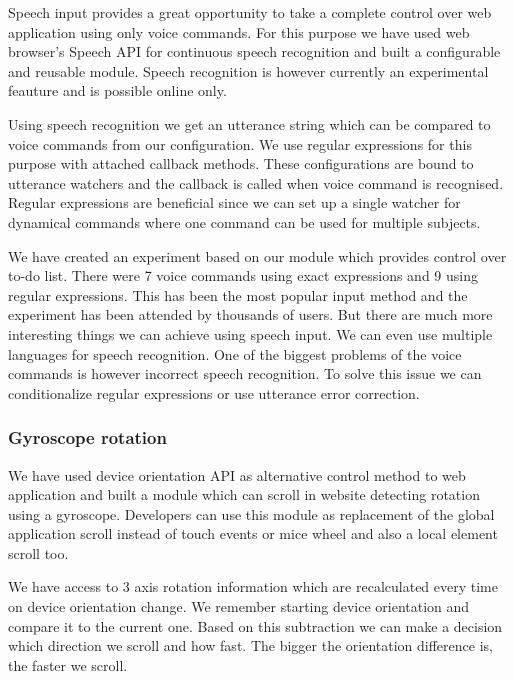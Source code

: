 \documentclass{iitsrc}
\begin{document}
Speech input provides a great opportunity to take a complete control over web application using only voice commands. For this purpose we have used web browser's Speech API for continuous speech recognition and built a configurable and reusable module. Speech recognition is however currently an experimental feauture and is possible online only.

Using speech recognition we get an utterance string which can be compared to voice commands from our configuration. We use regular expressions for this purpose with attached callback methods. These configurations are bound to utterance watchers and the callback is called when voice command is recognised. Regular expressions are beneficial since we can set up a single watcher for dynamical commands where one command can be used for multiple subjects.

We have created an experiment based on our module which provides control over to-do list. There were 7 voice commands using exact expressions and 9 using regular expressions. This has been the most popular input method and the experiment has been attended by thousands of users. But there are much more interesting things we can achieve using speech input. We can even use multiple languages for speech recognition. One of the biggest problems of the voice commands is however incorrect speech recognition. To solve this issue we can conditionalize regular expressions or use utterance error correction.


\subsubsection*{Gyroscope rotation} %
\label{ssub:gyroscope_rotation}

We have used device orientation API as alternative control method to web application and built a module which can scroll in website detecting rotation using a gyroscope. Developers can use this module as replacement of the global application scroll instead of touch events or mice wheel and also a local element scroll too.

We have access to 3 axis rotation information which are recalculated every time on device orientation change. We remember starting device orientation and compare it to the current one. Based on this subtraction we can make a decision which direction we scroll and how fast. The bigger the orientation difference is, the faster we scroll.
\end{document}
